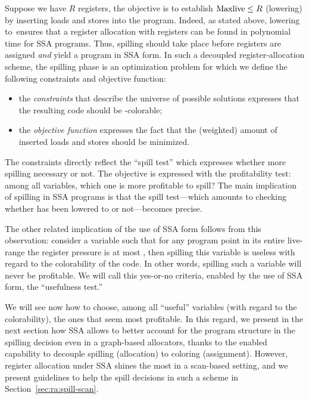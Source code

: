 {\medskip

Suppose we have $R$ registers, the objective is to establish $\mathrm{Maxlive}\le R$ (\maxlive lowering) by inserting loads and stores into the program. 
Indeed, as stated above, lowering \maxlive to~\regs ensures that a register allocation with \regs registers can be found in polynomial time for SSA programs. 
Thus, spilling should take place before registers are assigned \emph{and} yield a program in SSA form. 
In such a decoupled register-allocation scheme, the spilling phase is an optimization problem for which we define the following constraints and objective function:
\begin{itemize}
  \item the \emph{constraints} that describe the universe of possible solutions expresses that the resulting code should be \regs-colorable; 
  \item the \emph{objective function} expresses the fact that the (weighted) amount of inserted loads and stores should be minimized.
\end{itemize}

The constraints directly reflect the ``spill test'' which expresses whether more spilling necessary or not.
The objective is expressed with the profitability test: 
among all variables, which one is more profitable to spill? 
The main implication of spilling in SSA programs is that the spill test---which amounts to checking whether \maxlive has been lowered to \regs or not---becomes precise. 

The other related implication of the use of SSA form follows from this observation: 
consider a variable such that for any program point in its entire live-range the register pressure is at most \regs, then spilling this variable is useless with regard to the colorability of the code.
In other words, spilling such a variable will never be profitable. 
We will call this yes-or-no criteria, enabled by the use of SSA form, the ``usefulness test.''


We will see now how to choose, among all ``useful'' variables (with regard to the colorability), the ones that seem most profitable.
In this regard, we present in the next section how SSA allows to better account for the program structure in the spilling decision even in a graph-based allocators, thanks to the enabled capability to decouple spilling  (allocation) to coloring (assignment).
However, register allocation under SSA shines the most in a scan-based setting, and we present guidelines to help the spill decisions in such a scheme in Section~\ref{sec:ra:spill-scan}.


}
